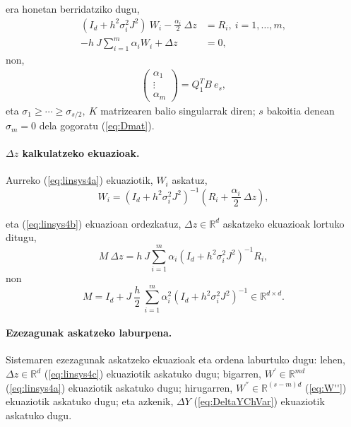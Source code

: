 era honetan berridatziko dugu,
\begin{align}
\label{eq:linsys4a}
(I_d+h^2\sigma_i^2J^2) \ W_i- \frac{\alpha_i}{2}\ \Delta z &=R_i, \ i=1,\dots,m,\\
\label{eq:linsys4b}
-h \ J \sum\limits_{i=1}^{m} \alpha_i W_i+\Delta z &=0,
\end{align}
non,
\begin{align*}
\left(
\begin{matrix}
\alpha_1 \\
\vdots \\
\alpha_m
\end{matrix}
\right)=Q_1^TB \ e_s,
\end{align*}
eta $\sigma_1 \geqslant \cdots \geqslant \sigma_{s/2}, \ K$ matrizearen balio singularrak diren; $s$ bakoitia denean $\sigma_m=0$ dela gogoratu (\ref{eq:Dmat}). 

\paragraph*{$\Delta z$ kalkulatzeko ekuazioak.}

Aurreko (\ref{eq:linsys4a}) ekuaziotik, $W_i$ askatuz, 
\begin{equation*}
W_i=(I_d+h^2\sigma_i^2J^2)^{-1} (R_i+\frac{\alpha_i}{2} \ \Delta z),
\end{equation*}

eta (\ref{eq:linsys4b}) ekuazioan ordezkatuz, $\Delta z \in \mathbb{R}^d$ askatzeko ekuazioak lortuko ditugu,
\begin{equation}
\label{eq:linsys4c}
M\ \Delta z=h \ J\sum\limits_{i=1}^{m}\alpha_i (I_d+h^2\sigma_i^2J^2)^{-1}R_i,
\end{equation}
non
\begin{equation}M=I_d+ J \ \frac{h}{2}\ \sum\limits_{i=1}^{m} \alpha_i^2 (I_d+h^2 \sigma_i^2 J^2)^{-1} \in \mathbb{R}^{d \times d}.
\end{equation}

\paragraph*{Ezezagunak askatzeko laburpena.}

Sistemaren ezezagunak askatzeko ekuazioak eta ordena laburtuko dugu: lehen, $\Delta z \in \mathbb{R}^{d}$  (\ref{eq:linsys4c}) ekuaziotik askatuko dugu; bigarren,  $W^{'} \in \mathbb{R}^{md}$ (\ref{eq:linsys4a}) ekuaziotik askatuko dugu; hirugarren, $W^{''} \in \mathbb{R}^{(s-m)d}$ (\ref{eq:W''}) ekuaziotik askatuko dugu; eta azkenik, $\Delta Y$ (\ref{eq:DeltaYChVar}) ekuaziotik askatuko dugu.

